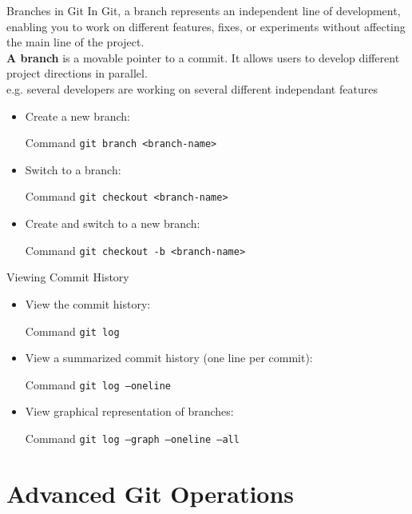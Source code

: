\documentclass{beamer}
\begin{document}
\begin{frame}{Branches in Git}
  \footnotesize
  In Git, a branch represents an independent line of development, enabling you to work on different features, fixes, or experiments without affecting the main line of the project.\\
  \textbf{A branch} is a movable pointer to a commit. It allows users to develop different project directions in parallel.\\
  e.g. several developers are working on several different independant features
  \begin{itemize}
      \item Create a new branch:
      \begin{block}{Command}
        \texttt{git branch <branch-name>}
      \end{block}
      \item Switch to a branch:
      \begin{block}{Command}
        \texttt{git checkout <branch-name>}
      \end{block}
      \item Create and switch to a new branch:
      \begin{block}{Command}
        \texttt{git checkout -b <branch-name>}
      \end{block}
  \end{itemize}
\end{frame}

\begin{frame}{Viewing Commit History}
  \begin{itemize}
    \item View the commit history:
    \begin{block}{Command}
      \texttt{git log}
    \end{block}
    \item View a summarized commit history (one line per commit):
    \begin{block}{Command}
      \texttt{git log --oneline}
    \end{block}
    \item View graphical representation of branches:
    \begin{block}{Command}
      \texttt{git log --graph --oneline --all}
    \end{block}
  \end{itemize}
\end{frame}

\section{Advanced Git Operations}
\end{document}
